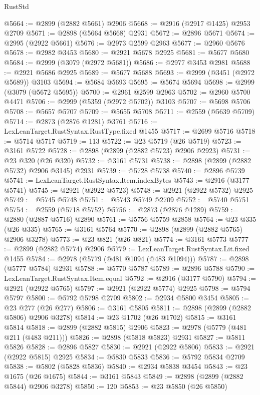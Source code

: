\begin{lexlean}{RustStd}
\begin{coremodule}
@5664 := @2899 (@2882 @5661) @2906
@5668 := @2916 (@2917 @1425) @2953 @2709
@5671 := @2898 (@5664 @5668) @2931
@5672 := @2896 @5671
@5674 := @2995 (@2922 @5661)
@5676 := @2973 @2599 @2963
@5677 := @2960 @5676
@5678 := @2982 @3453
@5680 := @2921 @5678 @2925
@5681 := @5677 @5680
@5684 := @2999 (@3079 (@2972 @5681))
@5686 := @2977 @3453 @2981
@5688 := @2921 @5686 @2925
@5689 := @5677 @5688
@5693 := @2999 (@3451 (@2972 @5689)) @3103
@5694 := @5684 @5693
@5695 := @5674 @5694
@5698 := @2999 (@3079 (@5672 @5695))
@5700 := @2961 @2599 @2963
@5702 := @2960 @5700 @4471
@5706 := @2999 (@5359 (@2972 @5702)) @3103
@5707 := @5698 @5706
@5708 := @5657 @5707
@5709 := @5655 @5708
@5711 := @2559 (@5639 @5709)
@5714 := @2873 (@2876 @1281) @3761
@5716 := LexLeanTarget.RustSyntax.RustType.fixed @1455
@5717 := @2699 @5716
@5718 := @5714 @5717
@5719 := 113
@5722 := @23 @5719 (@26 @5719)
@5723 := @3161 @5722
@5728 := @2898 (@2899 (@2882 @5723) @2906 @2923)
@5731 := @23 @320 (@26 @320)
@5732 := @3161 @5731
@5738 := @2898 (@2899 (@2882 @5732) @2906 @3145) @2931
@5739 := @5728 @5738
@5740 := @2896 @5739
@5741 := LexLeanTarget.RustSyntax.Item.indexBytes
@5743 := @2916 (@3177 @5741)
@5745 := @2921 (@2922 @5723)
@5748 := @2921 (@2922 @5732) @2925
@5749 := @5745 @5748
@5751 := @5743 @5749 @2709
@5752 := @5740 @5751
@5754 := @2559 (@5718 @5752)
@5756 := @2873 (@2876 @1289)
@5759 := @2880 (@2887 @5716) @2890
@5761 := @5756 @5759 @2858
@5764 := @23 @335 (@26 @335)
@5765 := @3161 @5764
@5770 := @2898 (@2899 (@2882 @5765) @2906 @3278)
@5773 := @23 @821 (@26 @821)
@5774 := @3161 @5773
@5777 := @2899 (@2882 @5774) @2906
@5779 := LexLeanTarget.RustSyntax.Lit.fixed @1455
@5784 := @2978 (@5779 (@481 @1094 (@483 @1094)))
@5787 := @2898 (@5777 @5784) @2931
@5788 := @5770 @5787
@5789 := @2896 @5788
@5790 := LexLeanTarget.RustSyntax.Item.equal
@5792 := @2916 (@3177 @5790)
@5794 := @2921 (@2922 @5765)
@5797 := @2921 (@2922 @5774) @2925
@5798 := @5794 @5797
@5800 := @5792 @5798 @2709
@5802 := @2934 @5800 @3454
@5805 := @23 @277 (@26 @277)
@5806 := @3161 @5805
@5811 := @2898 (@2899 (@2882 @5806) @2906 @3278)
@5814 := @23 @1702 (@26 @1702)
@5815 := @3161 @5814
@5818 := @2899 (@2882 @5815) @2906
@5823 := @2978 (@5779 (@481 @211 (@483 @211)))
@5826 := @2898 (@5818 @5823) @2931
@5827 := @5811 @5826
@5828 := @2896 @5827
@5830 := @2921 (@2922 @5806)
@5833 := @2921 (@2922 @5815) @2925
@5834 := @5830 @5833
@5836 := @5792 @5834 @2709
@5838 := @5802 (@5828 @5836)
@5840 := @2934 @5838 @3454
@5843 := @23 @1675 (@26 @1675)
@5844 := @3161 @5843
@5849 := @2898 (@2899 (@2882 @5844) @2906 @3278)
@5850 := 120
@5853 := @23 @5850 (@26 @5850)

\end{coremodule}
\end{lexlean}

